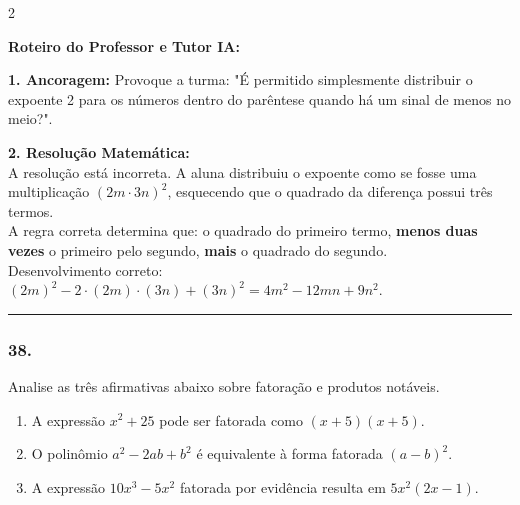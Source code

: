\begin{multicols*}{2}
\ifgabarito
    \begin{tcolorbox}[colback=CorTitUm!5, colframe=CorTitUm, boxrule=1pt, arc=4pt, left=6pt, right=6pt, top=6pt, bottom=6pt]
    \small\textbf{\textcolor{CorTitUm}{Roteiro do Professor e Tutor IA:}}\par\vspace{0.1cm}
    \color{CinzaEscuro}
    \textbf{1. Ancoragem:} Provoque a turma: "É permitido simplesmente distribuir o expoente 2 para os números dentro do parêntese quando há um sinal de menos no meio?".\par\vspace{0.1cm}
    \textbf{2. Resolução Matemática:}\\
    A resolução está incorreta. A aluna distribuiu o expoente como se fosse uma multiplicação $(2m \cdot 3n)^2$, esquecendo que o quadrado da diferença possui três termos.\\
    A regra correta determina que: o quadrado do primeiro termo, \textbf{menos duas vezes} o primeiro pelo segundo, \textbf{mais} o quadrado do segundo.\\
    Desenvolvimento correto:\\
    $(2m)^2 - 2 \cdot (2m) \cdot (3n) + (3n)^2 = 4m^2 - 12mn + 9n^2$.
    \end{tcolorbox}
\fi

\par\vspace{\espacoQuestao}

\noindent\textcolor{CorLinha}{\rule{\linewidth}{0.5pt}} 
\par\vspace{\espacoPreQuestao}
\subsubsection*{38.} 
\begin{enunciadoLiteral}
Analise as três afirmativas abaixo sobre fatoração e produtos notáveis.

\begin{enumerate}[label=\Roman*., itemsep=\espacoAlt]
    \item A expressão $x^2 + 25$ pode ser fatorada como $(x + 5)(x + 5)$.
    \item O polinômio $a^2 - 2ab + b^2$ é equivalente à forma fatorada $(a - b)^2$.
    \item A expressão $10x^3 - 5x^2$ fatorada por evidência resulta em $5x^2(2x - 1)$.
\end{enumerate}


\end{enunciadoLiteral}
\end{multicols*}
